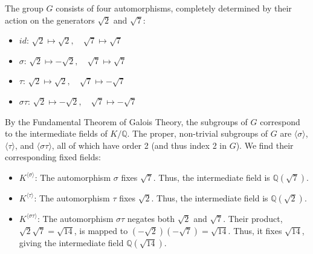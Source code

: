 \documentclass[12pt]{article}
\theoremstyle{definition}
\theoremstyle{remark}
\begin{document}
The group $G$ consists of four automorphisms, completely determined by their action on the generators $\sqrt{2}$ and $\sqrt{7}$:
\begin{itemize}
    \item $id$: $\sqrt{2} \mapsto \sqrt{2}, \quad \sqrt{7} \mapsto \sqrt{7}$
    \item $\sigma$: $\sqrt{2} \mapsto -\sqrt{2}, \quad \sqrt{7} \mapsto \sqrt{7}$
    \item $\tau$: $\sqrt{2} \mapsto \sqrt{2}, \quad \sqrt{7} \mapsto -\sqrt{7}$
    \item $\sigma\tau$: $\sqrt{2} \mapsto -\sqrt{2}, \quad \sqrt{7} \mapsto -\sqrt{7}$
\end{itemize}

By the Fundamental Theorem of Galois Theory, the subgroups of $G$ correspond to the intermediate fields of $K/\mathbb{Q}$. The proper, non-trivial subgroups of $G$ are $\langle \sigma \rangle$, $\langle \tau \rangle$, and $\langle \sigma\tau \rangle$, all of which have order 2 (and thus index 2 in $G$). We find their corresponding fixed fields:
\begin{itemize}
    \item $K^{\langle \sigma \rangle}$: The automorphism $\sigma$ fixes $\sqrt{7}$. Thus, the intermediate field is $\mathbb{Q}(\sqrt{7})$.
    \item $K^{\langle \tau \rangle}$: The automorphism $\tau$ fixes $\sqrt{2}$. Thus, the intermediate field is $\mathbb{Q}(\sqrt{2})$.
    \item $K^{\langle \sigma\tau \rangle}$: The automorphism $\sigma\tau$ negates both $\sqrt{2}$ and $\sqrt{7}$. Their product, $\sqrt{2}\sqrt{7} = \sqrt{14}$, is mapped to $(-\sqrt{2})(-\sqrt{7}) = \sqrt{14}$. Thus, it fixes $\sqrt{14}$, giving the intermediate field $\mathbb{Q}(\sqrt{14})$.
\end{itemize}
\begin{figure}[H]
    \centering
    \hspace{2cm} %
\end{figure}
\end{document}
